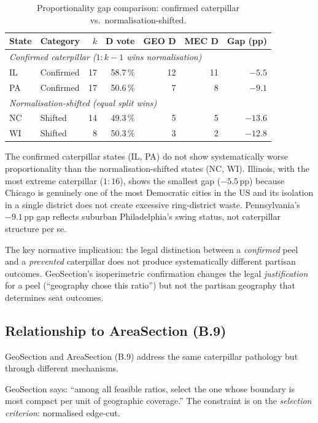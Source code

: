 \begin{table}[h]
\centering
\caption{Proportionality gap comparison: confirmed caterpillar vs.\ normalisation-shifted.}
\label{tab:caterpillar-comparison}
\begin{tabular}{llrrrrr}
\toprule
State & Category & $k$ & D vote & GEO D & MEC D & Gap (pp) \\
\midrule
\multicolumn{7}{l}{\textit{Confirmed caterpillar ($1:k-1$ wins normalisation)}} \\
IL & Confirmed & 17 & 58.7\,\% & 12 & 11 & $-5.5$ \\
PA & Confirmed & 17 & 50.6\,\% & 7  & 8  & $-9.1$ \\
\midrule
\multicolumn{7}{l}{\textit{Normalisation-shifted (equal split wins)}} \\
NC & Shifted & 14 & 49.3\,\% & 5  & 5  & $-13.6$ \\
WI & Shifted & 8  & 50.3\,\% & 3  & 2  & $-12.8$ \\
\bottomrule
\end{tabular}
\end{table}

The confirmed caterpillar states (IL, PA) do not show systematically worse
proportionality than the normalisation-shifted states (NC, WI).
Illinois, with the most extreme caterpillar ($1:16$), shows the smallest
gap ($-5.5$\,pp) because Chicago is genuinely one of the most Democratic cities
in the US and its isolation in a single district does not create excessive
ring-district waste.
Pennsylvania's $-9.1$\,pp gap reflects suburban Philadelphia's swing status,
not caterpillar structure per se.

The key normative implication: the legal distinction between a
\emph{confirmed} peel and a \emph{prevented} caterpillar does not produce
systematically different partisan outcomes.
GeoSection's isoperimetric confirmation changes the legal \emph{justification}
for a peel (``geography chose this ratio'') but not the partisan geography
that determines seat outcomes.

\subsection{Relationship to AreaSection (B.9)}

GeoSection and AreaSection (B.9) address the same caterpillar pathology but
through different mechanisms.

GeoSection says: ``among all feasible ratios, select the one whose boundary
is most compact per unit of geographic coverage.''
The constraint is on the \emph{selection criterion}: normalised edge-cut.

